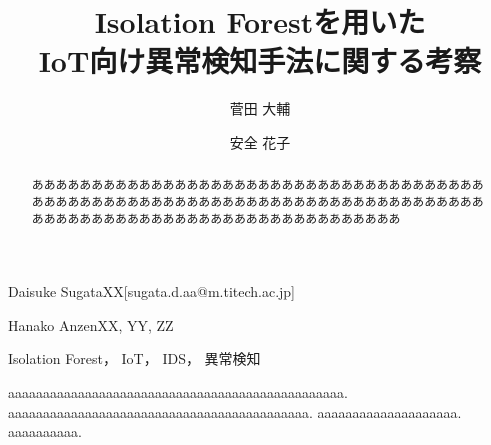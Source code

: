 \documentclass{css}
\begin{document}

\title{Isolation Forestを用いた\\IoT向け異常検知手法に関する考察}



\author{菅田 大輔}{Daisuke Sugata}{XX}[sugata.d.aa@m.titech.ac.jp]
\author{安全 花子}{Hanako Anzen}{XX, YY, ZZ}



\begin{abstract}
あああああああああああああああああああああああああああああああああああああああああああああああああああああああああああああああああああああああああああああああああああああああああああああああああああああああああああ

\end{abstract}


\begin{jkeyword}
Isolation Forest， IoT， IDS， 異常検知
\end{jkeyword}

\begin{eabstract}
aaaaaaaaaaaaaaaaaaaaaaaaaaaaaaaaaaaaaaaaaaaaaaaa.
aaaaaaaaaaaaaaaaaaaaaaaaaaaaaaaaaaaaaaaaaaa.
aaaaaaaaaaaaaaaaaaaa.
aaaaaaaaaa.

\end{eabstract}

\end{document}
